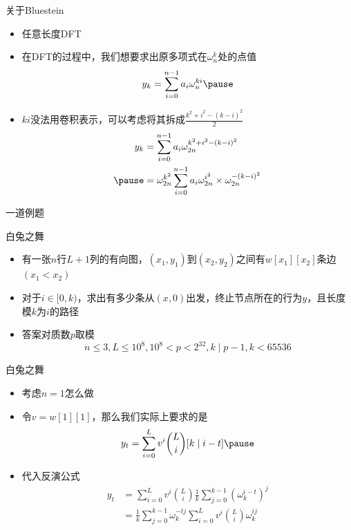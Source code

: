 \documentclass{beamer}
\begin{document}
\begin{frame}{关于Bluestein}
    \begin{itemize}
        \item 任意长度DFT \pause
        \item 在DFT的过程中，我们想要求出原多项式在$\omega_{n}^k$处的点值
        $$\begin{aligned}
            y_k = \sum_{i = 0}^{n - 1}a_i\omega_n^{ki} \pause
        \end{aligned}$$ 
        \item $ki$没法用卷积表示，可以考虑将其拆成$\frac{k^2 + i^2 - (k - i)^2}{2}$ \pause
        $$\begin{aligned}
            y_k &= \sum_{i = 0}^{n - 1}a_i\omega_{2n}^{k^2 + i^2 - (k - i)^2}\\ \pause
            &= \omega_{2n}^{k^2}\sum_{i = 0}^{n - 1}a_i\omega_{2n}^{i^2}\times \omega_{2n}^{-(k - i)^2}
        \end{aligned}$$
    \end{itemize}
\end{frame}

\begin{frame}{一道例题}
    \begin{block}{白兔之舞}
        \begin{itemize}
            \item 有一张$n$行$L + 1$列的有向图，$(x_1, y_1)$到$(x_2, y_2)$之间有$w[x_1][x_2]$条边$(x_1 < x_2)$
            \item 对于$i\in [0, k)$，求出有多少条从$(x, 0)$出发，终止节点所在的行为$y$，且长度模$k$为$i$的路径
            \item 答案对质数$p$取模
            $$n\leq 3, L\leq 10^8, 10^8 < p < 2^{32}, k \mid p - 1, k < 65536$$
        \end{itemize}
    \end{block}
\end{frame}

\begin{frame}{白兔之舞}
    \begin{itemize}
        \item 考虑$n = 1$怎么做 \pause
        \item 令$v = w[1][1]$，那么我们实际上要求的是 
        $$\begin{aligned}
            y_t = \sum_{i = 0}^L v^i {L\choose i} [k\mid i - t] \pause
        \end{aligned}$$
        \item 代入反演公式
        $$\begin{aligned}
            y_t &= \sum_{i = 0}^L v^i {L\choose i} \frac{1}{k} \sum_{j = 0}^{k - 1} (\omega_k^{i - t})^j\\
            &= \frac{1}{k}\sum_{j = 0}^{k - 1} \omega_{k}^{-tj} \sum_{i = 0}^L v^i {L\choose i} \omega_{k}^{ij}
        \end{aligned}$$
    \end{itemize}
\end{frame}
\end{document}
